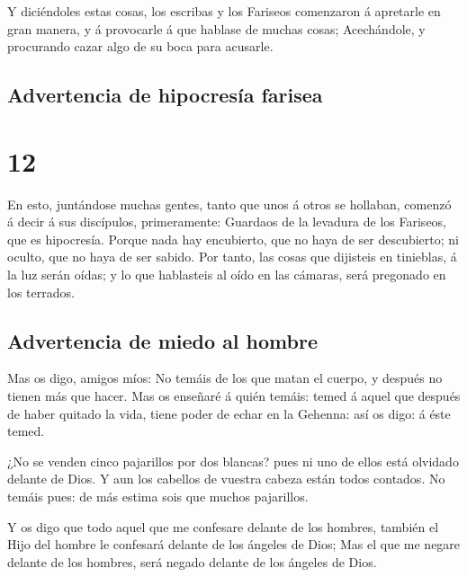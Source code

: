  Y diciéndoles estas cosas, los escribas y los Fariseos
comenzaron á apretarle en gran manera, y á provocarle á que hablase de
muchas cosas;  Acechándole, y procurando cazar algo de su
boca para acusarle.

\hypertarget{advertencia-de-hipocresuxeda-farisea}{%
\subsection{Advertencia de hipocresía
farisea}\label{advertencia-de-hipocresuxeda-farisea}}

\hypertarget{section-11}{%
\section{12}\label{section-11}}

 En esto, juntándose muchas gentes, tanto que unos á otros
se hollaban, comenzó á decir á sus discípulos, primeramente: Guardaos de
la levadura de los Fariseos, que es hipocresía.  Porque
nada hay encubierto, que no haya de ser descubierto; ni oculto, que no
haya de ser sabido.  Por tanto, las cosas que dijisteis en
tinieblas, á la luz serán oídas; y lo que hablasteis al oído en las
cámaras, será pregonado en los terrados.

\hypertarget{advertencia-de-miedo-al-hombre}{%
\subsection{Advertencia de miedo al
hombre}\label{advertencia-de-miedo-al-hombre}}

 Mas os digo, amigos míos: No temáis de los que matan el
cuerpo, y después no tienen más que hacer.  Mas os
enseñaré á quién temáis: temed á aquel que después de haber quitado la
vida, tiene poder de echar en la Gehenna: así os digo: á éste temed.

 ¿No se venden cinco pajarillos por dos blancas? pues ni
uno de ellos está olvidado delante de Dios.  Y aun los
cabellos de vuestra cabeza están todos contados. No temáis pues: de más
estima sois que muchos pajarillos.

 Y os digo que todo aquel que me confesare delante de los
hombres, también el Hijo del hombre le confesará delante de los ángeles
de Dios;  Mas el que me negare delante de los hombres,
será negado delante de los ángeles de Dios.

